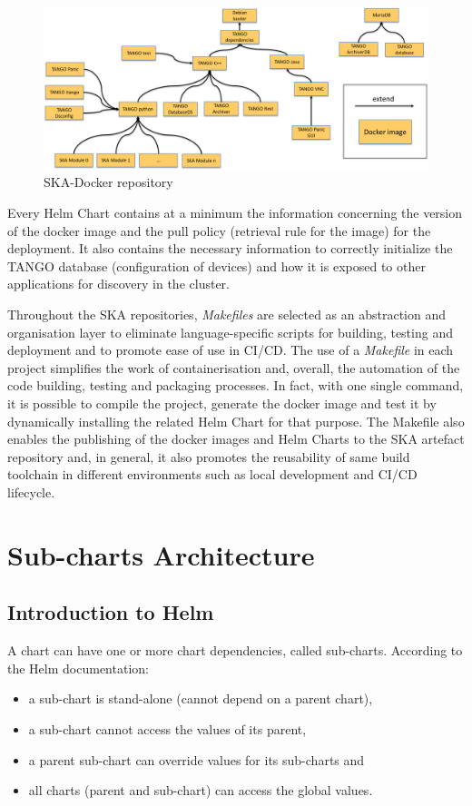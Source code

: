 \documentclass[a4paper]{spie}  %
\begin{document}
\begin{figure}[!htb]
   \centering
   \includegraphics*[width=0.8\columnwidth]{ska-docker}
   \caption{SKA-Docker repository}
   \label{fig:ska-docker}
\end{figure}


Every Helm Chart contains at a minimum the information concerning the version of the docker image and the pull policy (retrieval rule for the image) for the deployment. It also contains the necessary information to correctly initialize the TANGO database (configuration of devices) and how it is exposed to other applications for discovery in the cluster.

Throughout the SKA repositories, \textit{Makefiles} are selected as an abstraction and organisation layer to eliminate language-specific scripts for building, testing and deployment and to promote ease of use in CI/CD. The use of a \textit{Makefile} in each project simplifies the work of containerisation and, overall, the automation of the code building, testing and packaging processes. In fact, with one single command, it is possible to compile the project, generate the docker image and test it by dynamically installing the related Helm Chart for that purpose.
The Makefile also enables the publishing of the docker images and Helm Charts to the SKA artefact repository and, in general, it also promotes the reusability of same build toolchain in different environments such as local development and CI/CD lifecycle.

\section{Sub-charts Architecture}

\subsection{Introduction to Helm} \label{helm}
A chart can have one or more chart dependencies, called sub-charts. According to the Helm documentation:
\begin{itemize}
    \item a sub-chart is stand-alone (cannot depend on a parent chart),
    \item a sub-chart cannot access the values of its parent,
    \item a parent sub-chart can override values for its sub-charts and
    \item all charts (parent and sub-chart) can access the global values.
\end{itemize}
\end{document}
